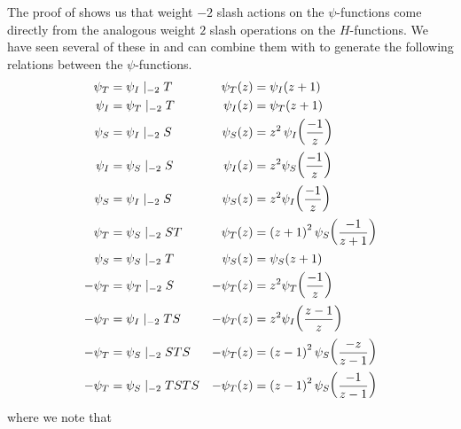 The proof of  shows us that weight $-2$ slash actions on the $\psi$-functions come directly from the analogous weight $2$ slash operations on the $H$-functions. We have seen several of these in  and can combine them with  to generate the following relations between the $\psi$-functions.
\begin{align}
    \psi_T &= \psi_I \mid_{-2} T &
    \psi_T(z) &= \psi_I\of{z + 1}
    \label{Ch4:Eq:psi_T_eq_psi_I_add_one}
    \\
    \psi_I &= \psi_T \mid_{-2} T &
    \psi_I(z) &= \psi_T\of{z + 1}
    \label{Ch4:Eq:psi_I_eq_psi_T_add_one}
    \\
    \psi_S &= \psi_I \mid_{-2} S &
    \psi_S(z) &= z^2 \, \psi_I\of{\frac{-1}{z}}
    \label{Ch4:Eq:psi_S_eq_zsq_mul_psi_I_neg_inv}
    \\
    \psi_I &= \psi_S \mid_{-2} S &
    \psi_I(z) &= z^2 \psi_S\of{\frac{-1}{z}}
    \label{Ch4:Eq:psi_I_to_psi_S}
    \\
    \psi_S &= \psi_I \mid_{-2} S &
    \psi_S(z) &= z^2 \psi_I\of{\frac{-1}{z}}
    \label{Ch4:Eq:psi_S_to_psi_I}
    \\
    \psi_T &= \psi_S \mid_{-2} ST &
    \psi_T(z) &= \parenth{z+1}^2 \psi_S\of{\frac{-1}{z+1}}
    \label{Ch4:Eq:psi_T_to_psi_S_add}
    \\
    \psi_{S} &= \psi_S \mid_{-2} T &
    \psi_S(z) &= \psi_S(z + 1)
    \label{Ch4:Eq:psi_S_one_periodic}
    \\
    - \psi_{T} &= \psi_T \mid_{-2} S &
    - \psi_T(z) &= z^2 \psi_T\of{\frac{-1}{z}} \label{Ch4:Eq:psi_T_eq_zsq_mul_psi_T_neg_inv}
    \\
    - \psi_{T} &= \psi_I \mid_{-2} TS &
    - \psi_T(z) &= z^2 \psi_I\of{\frac{z - 1}{z}}
    \label{Ch4:Eq:psi_T_eq_neg_psi_I_slash_TS}
    \\
    - \psi_{T} &= \psi_S \mid_{-2} STS &
    - \psi_T(z) &= \parenth{z - 1}^2 \psi_S\of{\frac{-z}{z - 1}}
    \label{Ch4:Eq:psi_T_eq_neg_psi_S_slash_STS}
    \\
    - \psi_{T} &= \psi_S \mid_{-2} TSTS &
    - \psi_T(z) &= \parenth{z - 1}^2 \psi_S\of{\frac{-1}{z - 1}}
    \label{Ch4:Eq:psi_T_as_psi_S_for_J3_J4}
\end{align}
where we note that
